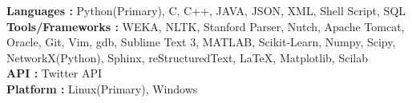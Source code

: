 
\textbf{Languages :}  Python(Primary), C, C++, JAVA, JSON, XML, Shell Script, SQL \\
\textbf{Tools/Frameworks :} WEKA, NLTK, Stanford Parser, Nutch, Apache Tomcat, Oracle, Git, Vim, gdb, Sublime Text 3, MATLAB, Scikit-Learn, Numpy, Scipy, NetworkX(Python), Sphinx, reStructuredText, \LaTeX, Matplotlib, Scilab\\
\textbf{API :} Twitter API \\
\textbf{Platform :} Linux(Primary), Windows
